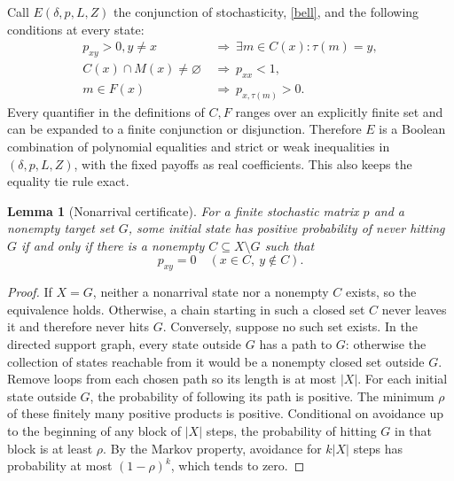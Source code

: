 \documentclass[11pt]{article}
\newtheorem{lemma}[theorem]{Lemma}
\theoremstyle{definition}
\begin{document}
Call $E(\delta,p,L,Z)$ the conjunction of stochasticity, \eqref{bell}, and the following conditions at every state:
\begin{align*}
 p_{xy}>0, y\ne x&\ \Longrightarrow\ \exists m\in C(x):\tau(m)=y,\\
 C(x)\cap M(x)\ne\varnothing&\ \Longrightarrow\ p_{xx}<1,\\
 m\in F(x)&\ \Longrightarrow\ p_{x,\tau(m)}>0.
\end{align*}
Every quantifier in the definitions of $C,F$ ranges over an explicitly finite set and can be expanded to a finite conjunction or disjunction. Therefore $E$ is a Boolean combination of polynomial equalities and strict or weak inequalities in $(\delta,p,L,Z)$, with the fixed payoffs as real coefficients. This also keeps the equality tie rule exact.

\begin{lemma}[Nonarrival certificate]
For a finite stochastic matrix $p$ and a nonempty target set $G$, some initial state has positive probability of never hitting $G$ if and only if there is a nonempty $C\subseteq X\setminus G$ such that
\[
 p_{xy}=0\quad(x\in C,\ y\notin C).
\]
\end{lemma}
\begin{proof}
If $X=G$, neither a nonarrival state nor a nonempty $C$ exists, so the equivalence holds. Otherwise, a chain starting in such a closed set $C$ never leaves it and therefore never hits $G$. Conversely, suppose no such set exists. In the directed support graph, every state outside $G$ has a path to $G$: otherwise the collection of states reachable from it would be a nonempty closed set outside $G$. Remove loops from each chosen path so its length is at most $|X|$. For each initial state outside $G$, the probability of following its path is positive. The minimum $\rho$ of these finitely many positive products is positive. Conditional on avoidance up to the beginning of any block of $|X|$ steps, the probability of hitting $G$ in that block is at least $\rho$. By the Markov property, avoidance for $k|X|$ steps has probability at most $(1-\rho)^k$, which tends to zero.
\end{proof}
\end{document}
